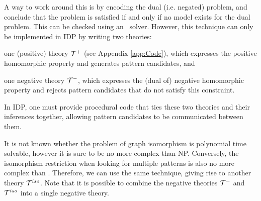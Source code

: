 A way to work around this is by encoding the dual (i.e. negated) problem, and conclude that the problem is satisfied if and only if no model exists for the dual problem.
This can be checked using an \NP\ solver.
However, this technique can only be implemented in IDP by writing two theories: 
\begin{compactitem}
\item one (positive) theory $\mathcal{T}^{+}$ (see Appendix \ref{app:Code}), which expresses the positive homomorphic property and generates pattern candidates, and
\item one negative theory $\mathcal{T}^{-}$, which expresses the (dual of) negative homomorphic property and rejects pattern candidates that do not satisfy this constraint.
\end{compactitem}
In IDP, one must provide procedural code that ties these two theories and their inferences together, allowing pattern candidates to be communicated between them.

It is not known whether the problem of graph isomorphism is polynomial time solvable,
however it is sure to be no more complex than NP.
Conversely, the isomorphism restriction when looking for multiple patterns is also no more complex than \coNP.
Therefore, we can use the same technique, giving rise to another theory $\mathcal{T}^{iso}$.
Note that it is possible to combine the negative theories $\mathcal{T}^{-}$ and $\mathcal{T}^{iso}$ into a single negative theory.




